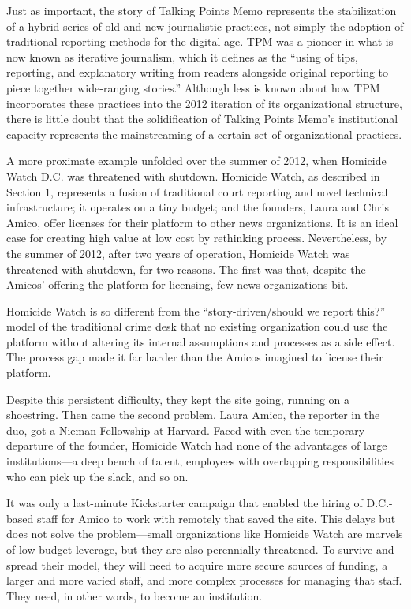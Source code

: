 Just as important, the story of Talking Points Memo represents the stabilization
of a hybrid series of old and new journalistic practices, not simply the adoption
of traditional reporting methods for the digital age. TPM was a pioneer in
what is now known as iterative journalism, which it defines as the ``using of tips,
reporting, and explanatory writing from readers alongside original reporting to
piece together wide-ranging stories.'' Although less is known about how TPM
incorporates these practices into the 2012 iteration of its organizational structure,
there is little doubt that the solidification of Talking Points Memo’s institutional
capacity represents the mainstreaming of a certain set of organizational practices.

A more proximate example unfolded over the summer of 2012, when Homicide
Watch D.C. was threatened with shutdown. Homicide Watch, as described in
Section 1, represents a fusion of traditional court reporting and novel technical
infrastructure; it operates on a tiny budget; and the founders, Laura and Chris
Amico, offer licenses for their platform to other news organizations. It is an ideal
case for creating high value at low cost by rethinking process.
Nevertheless, by the summer of 2012, after two years of operation, Homicide
Watch was threatened with shutdown, for two reasons. The first was that, despite
the Amicos’ offering the platform for licensing, few news organizations bit.

Homicide Watch is so different from the ``story-driven/should we report this?''
model of the traditional crime desk that no existing organization could use the
platform without altering its internal assumptions and processes as a side effect.
The process gap made it far harder than the Amicos imagined to license their
platform.

Despite this persistent difficulty, they kept the site going, running on a shoestring.
Then came the second problem. Laura Amico, the reporter in the duo, got a
Nieman Fellowship at Harvard. Faced with even the temporary departure of the
founder, Homicide Watch had none of the advantages of large institutions—a
deep bench of talent, employees with overlapping responsibilities who can pick
up the slack, and so on.

It was only a last-minute Kickstarter campaign that enabled the hiring of D.C.-
based staff for Amico to work with remotely that saved the site. This delays but
does not solve the problem—small organizations like Homicide Watch are marvels
of low-budget leverage, but they are also perennially threatened. To survive
and spread their model, they will need to acquire more secure sources of funding,
a larger and more varied staff, and more complex processes for managing that
staff. They need, in other words, to become an institution.


